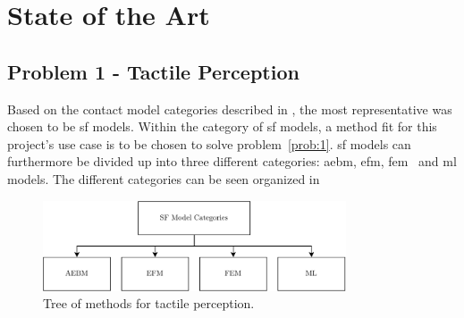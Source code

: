 \chapter{State of the Art}\label{ch:state-of-the-art}

\section{Problem 1 - Tactile Perception}\label{sec:lit-rev-problem-1}

Based on the contact model categories described in , the most representative was chosen to be \gls{sf} models. 
Within the category of \gls{sf} models, a method fit for this project's use case is to be chosen to solve problem~\ref{prob:1}. \gls{sf} models can furthermore be divided up into three different categories: \gls{aebm}, \gls{efm}, \gls{fem}~\cite{a-modified-elastic-foundation-contact-model-for-application-in-3d-models-of-the-prosthetic-knee} and \gls{ml} models. The different categories can be seen organized in  \medskip
%
\begin{figure}[h]
	\begin{small}
		\begin{center}
			\includegraphics[width=0.8\textwidth]{chapters/state-of-the-art/fig/sf-categories.pdf}
		\end{center}
		\caption{Tree of methods for tactile perception.}
		\label{fig:sf-categories}
	\end{small}
\end{figure}


